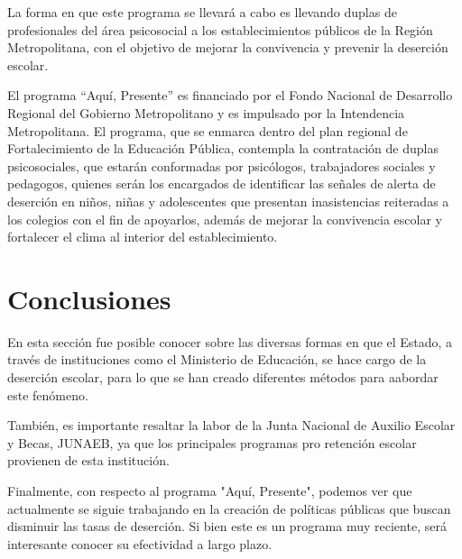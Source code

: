 La forma en que este programa se llevará a cabo es llevando duplas de profesionales del área psicosocial a los establecimientos públicos de la Región Metropolitana, con el objetivo de mejorar la convivencia y prevenir la deserción escolar. 

El programa “Aquí, Presente” es financiado por el Fondo Nacional de Desarrollo Regional del Gobierno Metropolitano y es impulsado por la Intendencia Metropolitana. El programa, que se enmarca dentro del plan regional de Fortalecimiento de la Educación Pública, contempla la contratación de duplas psicosociales, que estarán conformadas por psicólogos, trabajadores sociales y pedagogos, quienes serán los encargados de identificar las señales de alerta de deserción en niños, niñas y adolescentes que presentan inasistencias reiteradas a los colegios con el fin de apoyarlos, además de mejorar la convivencia escolar y fortalecer el clima al interior del establecimiento.

\section{Conclusiones}
En esta sección fue posible conocer sobre las diversas formas en que el Estado, a través de instituciones como el Ministerio de Educación, se hace cargo de la deserción escolar, para lo que se han creado diferentes métodos para aabordar este fenómeno. 

También, es importante resaltar la labor de la Junta Nacional de Auxilio Escolar y Becas, JUNAEB, ya que los principales programas pro retención escolar provienen de esta institución. 

Finalmente, con respecto al programa "Aquí, Presente", podemos ver que actualmente se siguie trabajando en la creación de políticas públicas que buscan disminuir las tasas de deserción. Si bien este es un programa muy reciente, será interesante conocer su efectividad a largo plazo. 